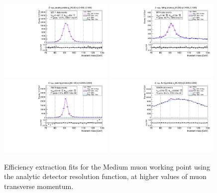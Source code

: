 \begin{figure}
\centering
\includegraphics[width=0.49\textwidth]{figures/Zmm_ResFunc_BkgLPi_pass_ptBin7_etaBin0.pdf}
\includegraphics[width=0.49\textwidth]{figures/Zmm_ResFunc_BkgLPi_fail_ptBin7_etaBin0.pdf}
\includegraphics[width=0.49\textwidth]{figures/Zmm_ResFunc_BkgLPi_pass_ptBin10_etaBin6.pdf}
\includegraphics[width=0.49\textwidth]{figures/Zmm_ResFunc_BkgLPi_fail_ptBin10_etaBin6.pdf}
\caption{Efficiency extraction fits for the Medium muon working point using the analytic detector resolution function, at higher values of muon transverse momentum.}
\label{fig:ZmmAltSigResFits2}
\end{figure}

